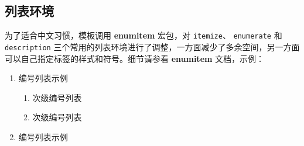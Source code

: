 \subsection*{列表环境}

为了适合中文习惯，模板调用 \textbf{enumitem} 宏包，对 \texttt{itemize}、 \texttt{enumerate} 和 \texttt{description} 三个常用的列表环境进行了调整，一方面减少了多余空间，另一方面可以自己指定标签的样式和符号。细节请参看 \textbf{enumitem} 文档，示例：
\begin{enumerate}
\item 编号列表示例
  \begin{enumerate}
    \item 次级编号列表
    \item 次级编号列表
  \end{enumerate}
\item 编号列表示例
\end{enumerate}